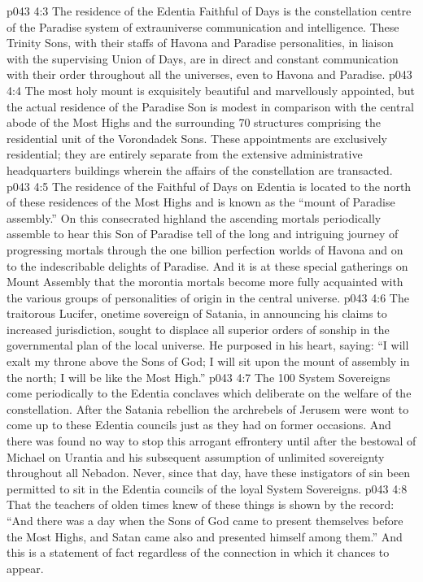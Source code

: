 \vs p043 4:3 The residence of the Edentia Faithful of Days is the constellation centre of the Paradise system of extrauniverse communication and intelligence. These Trinity Sons, with their staffs of Havona and Paradise personalities, in liaison with the supervising Union of Days, are in direct and constant communication with their order throughout all the universes, even to Havona and Paradise.
\vs p043 4:4 The most holy mount is exquisitely beautiful and marvellously appointed, but the actual residence of the Paradise Son is modest in comparison with the central abode of the Most Highs and the surrounding 70 structures comprising the residential unit of the Vorondadek Sons. These appointments are exclusively residential; they are entirely separate from the extensive administrative headquarters buildings wherein the affairs of the constellation are transacted.
\vs p043 4:5 The residence of the Faithful of Days on Edentia is located to the north of these residences of the Most Highs and is known as the “mount of Paradise assembly.” On this consecrated highland the ascending mortals periodically assemble to hear this Son of Paradise tell of the long and intriguing journey of progressing mortals through the one billion perfection worlds of Havona and on to the indescribable delights of Paradise. And it is at these special gatherings on Mount Assembly that the morontia mortals become more fully acquainted with the various groups of personalities of origin in the central universe.
\vs p043 4:6 The traitorous Lucifer, onetime sovereign of Satania, in announcing his claims to increased jurisdiction, sought to displace all superior orders of sonship in the governmental plan of the local universe. He purposed in his heart, saying: “I will exalt my throne above the Sons of God; I will sit upon the mount of assembly in the north; I will be like the Most High.”
\vs p043 4:7 \pc The 100 System Sovereigns come periodically to the Edentia conclaves which deliberate on the welfare of the constellation. After the Satania rebellion the archrebels of Jerusem were wont to come up to these Edentia councils just as they had on former occasions. And there was found no way to stop this arrogant effrontery until after the bestowal of Michael on Urantia and his subsequent assumption of unlimited sovereignty throughout all Nebadon. Never, since that day, have these instigators of sin been permitted to sit in the Edentia councils of the loyal System Sovereigns.
\vs p043 4:8 That the teachers of olden times knew of these things is shown by the record: “And there was a day when the Sons of God came to present themselves before the Most Highs, and Satan came also and presented himself among them.” And this is a statement of fact regardless of the connection in which it chances to appear.
